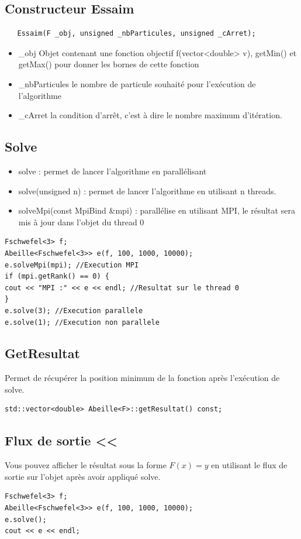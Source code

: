 \documentclass[12pt]{article}
\begin{document}
\newpage
\subsection{Constructeur Essaim}
\begin{lstlisting}
   Essaim(F _obj, unsigned _nbParticules, unsigned _cArret);
  \end{lstlisting}
  \begin{itemize}
      \item \_obj Objet contenant une fonction objectif f(vector<double> v), getMin() et getMax() pour donner les bornes de cette fonction
      \item  \_nbParticules le nombre de particule souhaité pour l'exécution de l'algorithme
      \item \_cArret la condition d'arrêt, c'est à dire le nombre maximum d'itération.
  \end{itemize}

\subsection{Solve}
\begin{itemize}
\item solve : permet de lancer l'algorithme en parallélisant
\item solve(unsigned n) : permet de lancer l'algorithme en utilisant n threads.
\item solveMpi(const MpiBind \&mpi) : parallélise en utilisant MPI, le résultat sera mis à jour dans l'objet du thread 0
\end{itemize}

\begin{lstlisting}
Fschwefel<3> f;
Abeille<Fschwefel<3>> e(f, 100, 1000, 10000);
e.solveMpi(mpi); //Execution MPI
if (mpi.getRank() == 0) {
cout << "MPI :" << e << endl; //Resultat sur le thread 0
}
e.solve(3); //Execution parallele
e.solve(1); //Execution non parallele
\end{lstlisting}


\subsection{GetResultat}
Permet de récupérer la position minimum de la fonction après l'exécution de solve.
\begin{lstlisting}
std::vector<double> Abeille<F>::getResultat() const;
\end{lstlisting}

\newpage
\subsection{Flux de sortie <<}
Vous pouvez afficher le résultat sous la forme $F(x)=y$ en utilisant le flux de sortie sur l'objet après avoir appliqué solve.
\begin{lstlisting}
Fschwefel<3> f;
Abeille<Fschwefel<3>> e(f, 100, 1000, 10000);
e.solve();
cout << e << endl;
\end{lstlisting}
\end{document}
